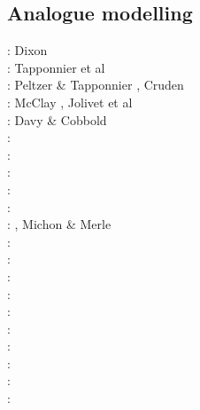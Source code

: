 \subsection{Analogue modelling}

{\scriptsize
\nineteenseventyfive: Dixon \cite{dixo75}\\
\nineteeneightytwo: Tapponnier et al \cite{tapl82}\\
\nineteeneightyeight: Peltzer \& Tapponnier \cite{peta88}, Cruden \cite{crud88}\\
\nineteenninety: McClay \cite{mccl90}, Jolivet et al \cite{jodc90}\\
\nineteenninetyone: Davy \& Cobbold \cite{daco91}\\
\nineteenninetytwo: \cite{salt92}\\
\nineteenninetythree: \cite{nabr93}\cite{shem93}\\
\nineteenninetyseven: \cite{vank97}\\
\nineteenninetyeight: \cite{bubr98}\\
\nineteenninetynine: \cite{dava99}\cite{befo99}\cite{fagd99}\cite{nagg99}\\
\twothousand: \cite{sche00}\cite{sobm00}\cite{chlb00}, Michon \& Merle \cite{mime00}\\
\twothousandone: \cite{haki01}\cite{chys01}\\
\twothousandtwo: \cite{dagl02}\\
\twothousandthree: \cite{smbs03}\cite{muso03}\cite{nagv03}\\
\twothousandfour: \cite{sche04}\cite{sche04b}\\
\twothousandfive: \cite{jujb05}\cite{sche05}\cite{sobb05}\\
\twothousandsix: \cite{scbb06}\cite{tibs06}\cite{crnp06}\cite{lemm06}\cite{pabs06}\cite{malm06}\\
\twothousandseven: \cite{socb07}\\
\twothousandeight: \cite{clbz08}\cite{fufh08}\cite{esfm08}\\
\twothousandnine: \cite{pina09}\cite{bonn09}\\
\twothousandeleven: \cite{dalt11}\cite{gopc11}\cite{grhd11}\\
}
